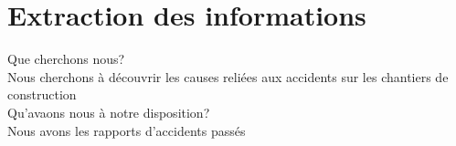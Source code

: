 \section{Extraction des informations}

	\begin{frame}
		Que cherchons nous?\\
		Nous cherchons à découvrir les causes reliées aux accidents sur les chantiers de construction\\
		Qu'avaons nous à notre disposition?\\
		Nous avons les rapports d'accidents passés\\
	\end{frame}